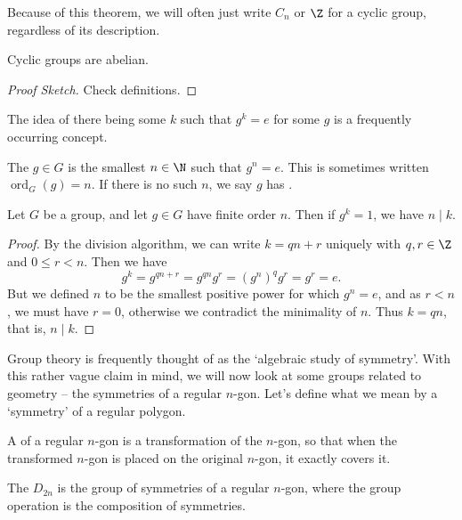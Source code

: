 Because of this theorem, we will often just write $C_n$ or $\Z$ for a cyclic group, regardless of its description.

\begin{proposition}
	Cyclic groups are abelian.
\end{proposition}
\begin{proof}[Proof Sketch]
	Check definitions.
\end{proof}

The idea of there being some $k$ such that $g^k = e$ for some $g$ is a frequently occurring concept.

\begin{definition}
	The  $g \in G$ is the smallest $n \in \N$ such that $g^n = e$. This is sometimes written $\operatorname{ord}_G(g) = n$. If there is no such $n$, we say $g$ has .
\end{definition}

\begin{theorem}
	Let $G$ be a group, and let $g \in G$ have finite order $n$. Then if $g^k = 1$, we have $n \mid k$.
\end{theorem}
\begin{proof}
	By the division algorithm, we can write $k = qn + r$ uniquely with $q, r \in \Z$ and $0 \leq r < n$. Then we have
	$$
	g^{k} = g^{qn + r} = g^{qn} g^r = (g^n)^q g^r = g^r = e.
	$$
	But we defined $n$ to be the smallest positive power for which $g^n = e$, and as $r < n$, we must have $r = 0$, otherwise we contradict the minimality of $n$. Thus $k = qn$, that is, $n \mid k$.
\end{proof}


Group theory is frequently thought of as the `algebraic study of symmetry'. With this rather vague claim in mind, we will now look at some groups related to geometry -- the symmetries of a regular $n$-gon. Let's define what we mean by a `symmetry' of a regular polygon.

\begin{definition}
	A  of a regular $n$-gon is a transformation of the $n$-gon, so that when the transformed $n$-gon is placed on the original $n$-gon, it exactly covers it.
\end{definition}

\begin{definition}
	The  $D_{2n}$ is the group of symmetries of a regular $n$-gon, where the group operation is the composition of symmetries.
\end{definition}

